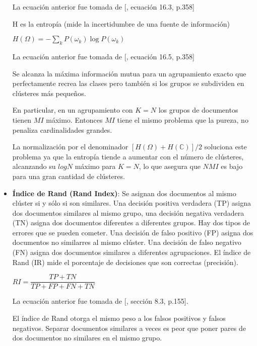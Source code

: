 \documentclass{llncs}
\begin{document}
\begin{itemize}
	La ecuaci\'on anterior fue tomada de [\cite{B1}, ecuaci\'on 16.3, p.358]
	
	\vspace{0.5em}
	H es la entropía (mide la incertidumbre de una fuente de información)
	
	\begin{center}
		$ H(\Omega) = -\sum_{k}P(\omega_{k}) \log P(\omega_{k}) $ 
	\end{center}
	
	La ecuaci\'on anterior fue tomada de [\cite{B1}, ecuaci\'on 16.5, p.358]
	
	Se alcanza la máxima información mutua para un agrupamiento exacto que perfectamente recrea las clases pero también si los grupos se subdividen en cl\'usteres más pequeños. 
	
	En particular, en un agrupamiento con $ K = N $ los grupos de documentos tienen $ MI $ máximo. Entonces $ MI $ tiene el mismo problema que la pureza, no penaliza cardinalidades grandes.
	
	La normalización por el denominador $ [H(\Omega) + H(\mathbb{C})]/2 $ soluciona este problema ya que la entropía tiende a aumentar con el número de cl\'usteres, alcanzando su $ log N $ máximo para $ K = N $, lo que asegura que $ NMI $ es bajo para una gran cantidad de cl\'usteres.
	
	\vspace{1em}
	\item \textbf{\'Indice de Rand (Rand Index)}: Se asignan dos documentos al mismo clúster si y sólo si son similares. Una decisión positiva verdadera (TP) asigna
	dos documentos similares al mismo grupo, una decisión negativa verdadera (TN) asigna dos documentos diferentes a diferentes grupos. Hay dos tipos
	de errores que se pueden cometer. Una decisión de falso positivo (FP) asigna dos documentos no similarres al mismo clúster. Una decisión de falso negativo (FN) asigna
	dos documentos similares a diferentes agrupaciones. El índice de Rand (IR) mide el porcentaje de decisiones que son correctas (precisión).
	
	\begin{center}
		$ RI = \dfrac{TP + TN}{TP + FP + FN + TN} $ 
	\end{center}
	
	La ecuaci\'on anterior fue tomada de [\cite{B1}, secci\'on 8.3, p.155].
	
	El índice de Rand otorga el mismo peso a los falsos positivos y falsos negativos. Separar documentos similares a veces es peor que poner pares de dos documentos no similares en el mismo grupo.
	

\end{itemize}
\end{document}
